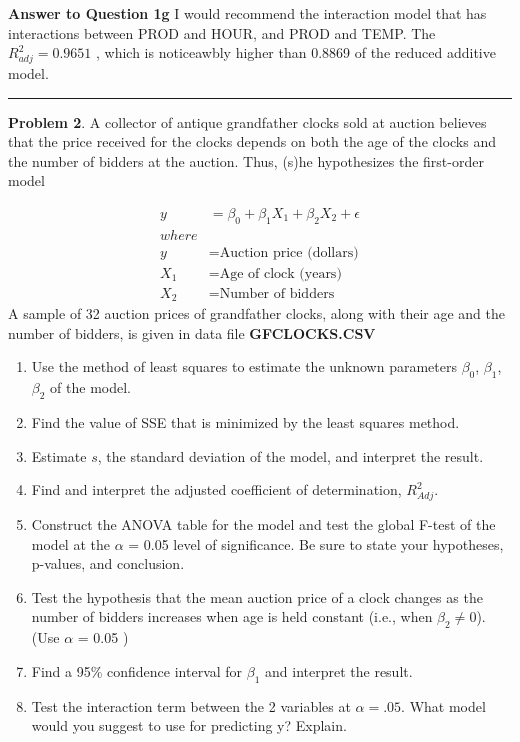 \documentclass[
]{article}
\begin{document}
\textbf{Answer to Question 1g} I would recommend the interaction model
that has interactions between PROD and HOUR, and PROD and TEMP. The
\(R^2_{adj} = 0.9651\) , which is noticeawbly higher than 0.8869 of the
reduced additive model.

\begin{center}\rule{0.5\linewidth}{0.5pt}\end{center}

\textbf{Problem 2}. A collector of antique grandfather clocks sold at
auction believes that the price received for the clocks depends on both
the age of the clocks and the number of bidders at the auction. Thus,
(s)he hypothesizes the first-order model

\[
\begin{aligned}
y &= \beta_0 + \beta_1X_1+\beta_2X_2 +\epsilon\\
where\\
y &= \mbox{Auction price (dollars)}\\
X_1 &= \mbox{Age of clock (years)}\\
X_2 &= \mbox{Number of bidders}
\end{aligned}
\] A sample of 32 auction prices of grandfather clocks, along with their
age and the number of bidders, is given in data file
\textbf{GFCLOCKS.CSV}

\begin{enumerate}
\def\labelenumi{\alph{enumi}.}
\item
  Use the method of least squares to estimate the unknown parameters
  \(\beta_0\), \(\beta_1\), \(\beta_2\) of the model.
\item
  Find the value of SSE that is minimized by the least squares method.
\item
  Estimate \(s\), the standard deviation of the model, and interpret the
  result.
\item
  Find and interpret the adjusted coefficient of determination,
  \(R^2_{Adj}\).
\item
  Construct the ANOVA table for the model and test the global F-test of
  the model at the \(\alpha\) = 0.05 level of significance. Be sure to
  state your hypotheses, p-values, and conclusion.
\item
  Test the hypothesis that the mean auction price of a clock changes as
  the number of bidders increases when age is held constant (i.e., when
  \(\beta_2\neq0\)). (Use \(\alpha\) = 0.05 )
\item
  Find a 95\% confidence interval for \(\beta_1\) and interpret the
  result.
\item
  Test the interaction term between the 2 variables at \(\alpha = .05\).
  What model would you suggest to use for predicting y? Explain.
\end{enumerate}
\end{document}
